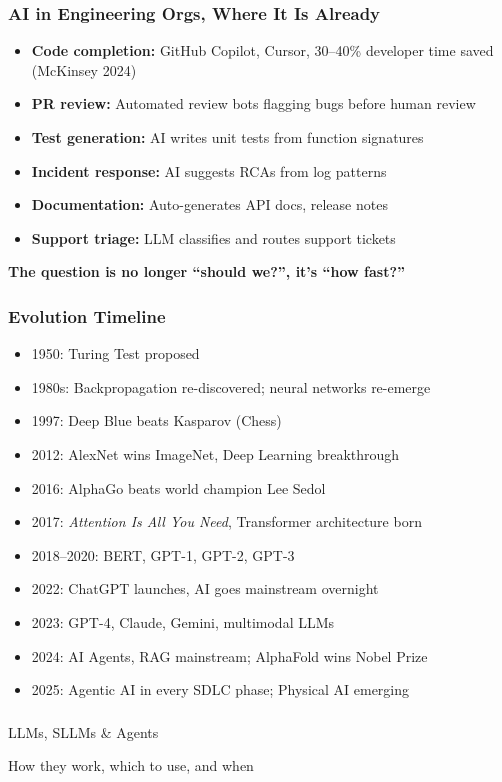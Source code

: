 \begin{frame}[fragile]\frametitle{AI in Engineering Orgs, Where It Is Already}
\begin{itemize}
\item \textbf{Code completion:} GitHub Copilot, Cursor, 30--40\% developer time saved (McKinsey 2024)
\item \textbf{PR review:} Automated review bots flagging bugs before human review
\item \textbf{Test generation:} AI writes unit tests from function signatures
\item \textbf{Incident response:} AI suggests RCAs from log patterns
\item \textbf{Documentation:} Auto-generates API docs, release notes
\item \textbf{Support triage:} LLM classifies and routes support tickets
\end{itemize}
\textbf{The question is no longer ``should we?'', it's ``how fast?''}
\end{frame}

\begin{frame}[fragile]\frametitle{Evolution Timeline}
\begin{itemize}
\item 1950: Turing Test proposed
\item 1980s: Backpropagation re-discovered; neural networks re-emerge
\item 1997: Deep Blue beats Kasparov (Chess)
\item 2012: AlexNet wins ImageNet, Deep Learning breakthrough
\item 2016: AlphaGo beats world champion Lee Sedol
\item 2017: \textit{Attention Is All You Need}, Transformer architecture born
\item 2018--2020: BERT, GPT-1, GPT-2, GPT-3
\item 2022: ChatGPT launches, AI goes mainstream overnight
\item 2023: GPT-4, Claude, Gemini, multimodal LLMs
\item 2024: AI Agents, RAG mainstream; AlphaFold wins Nobel Prize
\item 2025: Agentic AI in every SDLC phase; Physical AI emerging
\end{itemize}
\end{frame}


\begin{frame}[fragile]\frametitle{}
\begin{center}
{\Large LLMs, SLLMs \& Agents}

{\small How they work, which to use, and when}
\end{center}
\end{frame}


